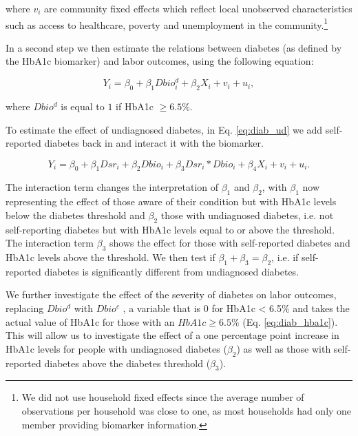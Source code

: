 \documentclass[12pt,english]{article}
\begin{document}
where $v_{i}$ are community fixed effects which reflect local unobserved characteristics such as access to healthcare, poverty and unemployment in the community.\footnote{We did not use household fixed effects since the average number of observations per household was close to one, as most households had only one member providing biomarker information.}

In a second step we then estimate the relations between diabetes (as defined by the \ac{HbA1c} biomarker) and labor outcomes, using the following equation:

\begin{equation}
Y_{i}=\beta_{0}+\beta_{1}Dbio^{d}_{i}+\beta_{2}X_{i}+v_{i}+u_{i}\label{eq:diab},
\end{equation}

where $Dbio^{d}$ is equal to $1$ if \ac{HbA1c} $\geq6.5\%$. 

To estimate the effect of undiagnosed diabetes, in Eq. \ref{eq:diab_ud} we add self-reported diabetes back in and interact it with the biomarker.

\begin{equation}
Y_{i}=\beta_{0}+\beta_{1}Dsr_{i}+\beta_{2}Dbio_{i}+\beta_{3}Dsr_{i}*Dbio_{i}+\beta_{4}X_{i}+v_{i}+u_{i}.\label{eq:diab_ud}
\end{equation}

The interaction term changes the interpretation of $\beta_{1}$ and $\beta_{2}$, with $\beta_{1}$ now representing the effect of those aware of their condition but with \ac{HbA1c} levels below the diabetes threshold and $\beta_{2}$ those with undiagnosed diabetes, i.e. not self-reporting diabetes but with \ac{HbA1c} levels equal to or above the threshold. The interaction term $\beta_{3}$ shows the effect for those with self-reported diabetes and \ac{HbA1c} levels above the threshold. We then test if $\beta_{1} + \beta_{3} = \beta_{2}$, i.e. if self-reported diabetes is significantly different from undiagnosed diabetes.

We further investigate the effect of the severity of diabetes on labor outcomes, replacing $Dbio^{d}$ with $Dbio^{c}$ , a variable that is 0 for \ac{HbA1c} < 6.5\% and takes the actual value of \ac{HbA1c} for those with an $HbA1c \geq 6.5\%$ (Eq. \ref{eq:diab_hba1c}). This will allow us to investigate the effect of a one percentage point increase in \ac{HbA1c} levels for people with undiagnosed diabetes ($\beta_{2}$) as well as those with self-reported diabetes above the diabetes threshold ($\beta_{3}$).
\end{document}
